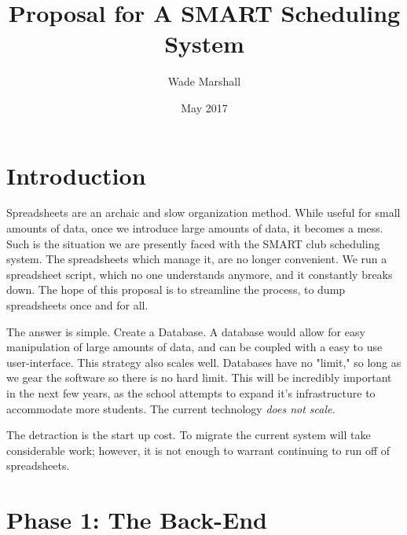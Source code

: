 \documentclass{article}
\title{Proposal for A SMART Scheduling System}
\author{Wade Marshall }
\date{May 2017}
\begin{document}
\maketitle

\section{Introduction}
Spreadsheets are an archaic and slow organization method. While useful for small amounts of data, once we introduce large amounts of data, it
becomes a mess. Such is the situation we are presently faced with the SMART club scheduling system. The spreadsheets which manage it, are no
longer convenient. We run a spreadsheet script, which no one understands anymore, and it constantly breaks down. The hope of this proposal is to 
streamline the process, to dump spreadsheets once and for all. 

The answer is simple. Create a Database. A database would allow for easy manipulation of large amounts of data, and can be coupled with a easy
to use user-interface. This strategy also scales well. Databases have no "limit," so long as we gear the software so there is no hard limit. This will be incredibly important in the next few years, as the school attempts to expand it's infrastructure to accommodate more students. The current technology \emph{does not scale.}

The detraction is the start up cost. To migrate the current system will take considerable work; however, it is not enough to warrant continuing
to run off of spreadsheets. 

\section{Phase 1: The Back-End}
\end{document}
